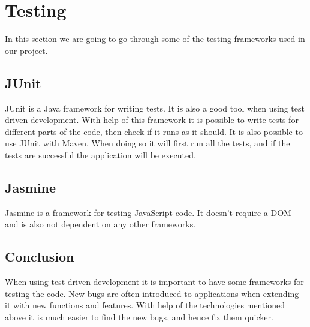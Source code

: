 \section{Testing}
\label{section:testing}

In this section we are going to go through some of the testing frameworks used in our project.

\subsection{JUnit} \nocite{JUnit}

JUnit is a Java framework for writing tests. It is also a good tool when using test driven development.
With help of this framework it is possible to write tests for different parts of the code, then check if it runs as it should.
It is also possible to use JUnit with Maven.
When doing so it will first run all the tests, and if the tests are successful the application will be executed.

\subsection{Jasmine} \nocite{Jasmine}

Jasmine is a framework for testing JavaScript code.	
It doesn't require a DOM and is also not dependent on any other frameworks.

\subsection{Conclusion}

When using test driven development it is important to have some frameworks for testing the code.
New bugs are often introduced to applications when extending it with new functions and features.
With help of the technologies mentioned above it is much easier to find the new bugs, and hence fix them quicker.


\iffalse


